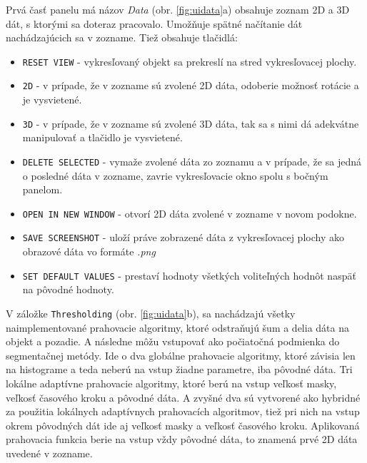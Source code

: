 \documentclass[a4paper,11pt,oneside]{article}%
\begin{document}
Prvá časť panelu má názov \textit{Data} (obr. \ref{fig:uidata}a) obsahuje zoznam 2D a 3D dát, s ktorými sa doteraz pracovalo. Umožňuje spätné načítanie dát nachádzajúcich sa v zozname. Tiež obsahuje tlačidlá: 
\begin{itemize}
\item \texttt{RESET VIEW} - vykresľovaný objekt sa prekreslí na stred vykresľovacej plochy.  
\item \texttt{2D} - v prípade, že v zozname sú zvolené 2D dáta, odoberie možnosť rotácie a je vysvietené.
\item \texttt{3D} - v prípade, že v zozname sú zvolené 3D dáta, tak sa s nimi dá adekvátne manipulovať a tlačidlo je vysvietené.
\item \texttt{DELETE SELECTED} - vymaže zvolené dáta zo zoznamu a v prípade, že sa jedná o posledné dáta v zozname, zavrie vykresľovacie okno spolu s bočným panelom.
\item \texttt{OPEN IN NEW WINDOW} - otvorí 2D dáta zvolené v zozname v novom podokne.
\item \texttt{SAVE SCREENSHOT} - uloží práve zobrazené dáta z vykresľovacej plochy ako obrazové dáta vo formáte \textit{.png}
\item \texttt{SET DEFAULT VALUES} - prestaví hodnoty všetkých voliteľných hodnôt naspäť na pôvodné  hodnoty.
\end{itemize}

V záložke \texttt{Thresholding} (obr. \ref{fig:uidata}b), sa nachádzajú všetky naimplementované prahovacie algoritmy, ktoré odstraňujú šum a delia dáta na objekt a pozadie. A následne môžu vstupovať ako počiatočná podmienka do segmentačnej metódy. Ide o dva globálne prahovacie algoritmy, ktoré závisia len na histograme a teda neberú na vstup žiadne parametre, iba pôvodné dáta. Tri lokálne adaptívne prahovacie algoritmy, ktoré berú na vstup veľkosť masky, veľkosť časového kroku a pôvodné dáta. A zvyšné dva sú vytvorené ako hybridné za použitia lokálnych adaptívnych prahovacích algoritmov, tiež pri nich na vstup okrem pôvodných dát ide aj veľkosť masky a veľkosť časového kroku. Aplikovaná prahovacia funkcia berie na vstup vždy pôvodné dáta, to znamená prvé 2D dáta uvedené v zozname.
\end{document}

